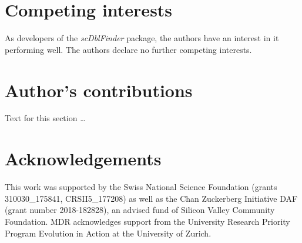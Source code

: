 \documentclass{bmcart}
\begin{document}
\begin{backmatter}

\section*{Competing interests}
As developers of the \textit{scDblFinder} package, the authors have an interest in it performing well. The authors declare no further competing interests.

\section*{Author's contributions}
    Text for this section \ldots

\section*{Acknowledgements}
This work was supported by the Swiss National Science Foundation (grants 310030_175841, CRSII5_177208) as well as the Chan Zuckerberg Initiative DAF (grant number 2018-182828), an advised fund of Silicon Valley Community Foundation. MDR acknowledges support from the University Research Priority Program Evolution in Action at the University of Zurich.




\end{backmatter}
\end{document}
